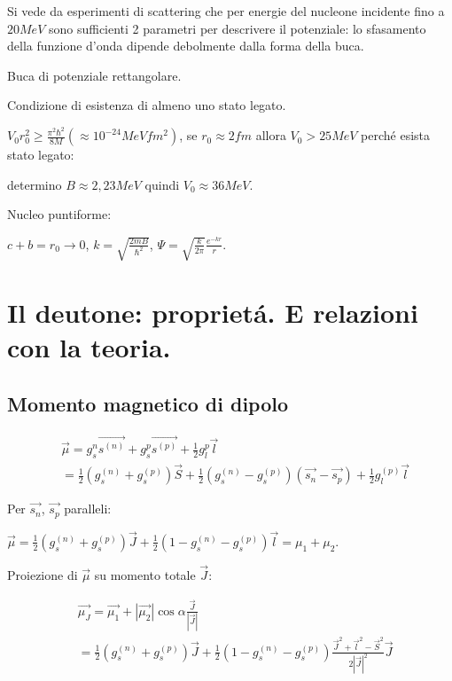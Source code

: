 \documentclass[main.tex]{subfiles}
\begin{document}
Si vede da esperimenti di scattering che per energie del nucleone incidente fino a $20 MeV$ sono sufficienti 2 parametri per descrivere il potenziale: lo sfasamento della funzione d'onda dipende debolmente dalla forma della buca.

Buca di potenziale rettangolare.

Condizione di esistenza di almeno uno stato legato.

$V_0r_0^2\geq\frac{\pi^2\hbar^2}{8M}(\approx 10^{-24}MeV fm^2)$, se $r_0\approx 2 fm$ allora $V_0>25 MeV$ perch\'e esista stato legato: 

determino $B\approx 2,23 MeV$ quindi $V_0\approx 36 MeV$.

Nucleo puntiforme:

$c+b=r_0\rightarrow0$, $k=\sqrt{\frac{2mB}{\hbar^2}}$, $\Psi=\sqrt{\frac{k}{2\pi}}\frac{e^{-kr}}{r}$.

\section{Il deutone: propriet\'a. E relazioni con la teoria.}

\subsection{Momento magnetico di dipolo}
\begin{align*}
&\vec{\mu}=g_s^n\vec{s^{(n)}}+g_s^p\vec{s^{(p)}}+\frac{1}{2}g_l^p\vec{l}\\
&=\frac{1}{2}(g_s^{(n)}+g_s^{(p)})\vec{S}+\frac{1}{2}(g_s^{(n)}-g_s^{(p)})(\vec{s_n}-\vec{s_p})+\frac{1}{2}g_l^{(p)}\vec{l}
\end{align*}

Per $\vec{s_n}$, $\vec{s_p}$ paralleli:

$\vec{\mu}=\frac{1}{2}(g_s^{(n)}+g_s^{(p)})\vec{J}+\frac{1}{2}(1-g_s^{(n)}-g_s^{(p)})\vec{l}=\mu_1+\mu_2$.

Proiezione di $\vec{\mu}$ su momento totale $\vec{J}$:

\begin{align*}
&\vec{\mu_J}=\vec{\mu_1}+|\vec{\mu_2}|\cos{\alpha}\frac{\vec{J}}{|\vec{J}|}\\
&=\frac{1}{2}(g_s^{(n)}+g_s^{(p)})\vec{J}+\frac{1}{2}(1-g_s^{(n)}-g_s^{(p)})\frac{\vec{J}^2+\vec{l}^2-\vec{S}^2}{2|\vec{J}|^2}\vec{J}
\end{align*}
\end{document}
